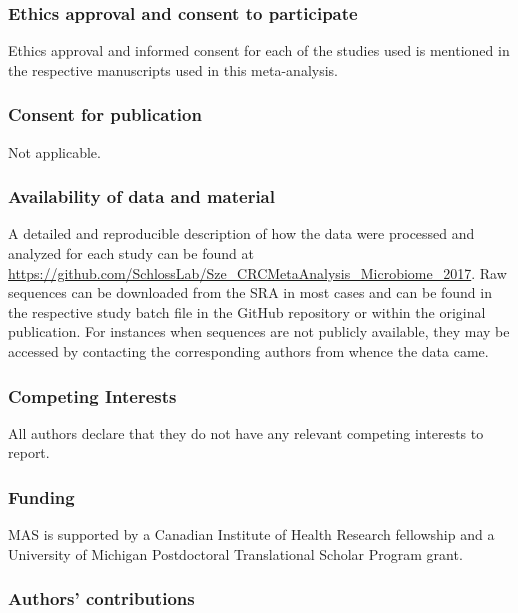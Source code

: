 \documentclass[12pt,]{article}
\begin{document}
\subsubsection{Ethics approval and consent to
participate}\label{ethics-approval-and-consent-to-participate}

Ethics approval and informed consent for each of the studies used is
mentioned in the respective manuscripts used in this meta-analysis.

\subsubsection{Consent for publication}\label{consent-for-publication}

Not applicable.

\subsubsection{Availability of data and
material}\label{availability-of-data-and-material}

A detailed and reproducible description of how the data were processed
and analyzed for each study can be found at
\url{https://github.com/SchlossLab/Sze_CRCMetaAnalysis_Microbiome_2017}.
Raw sequences can be downloaded from the SRA in most cases and can be
found in the respective study batch file in the GitHub repository or
within the original publication. For instances when sequences are not
publicly available, they may be accessed by contacting the corresponding
authors from whence the data came.

\subsubsection{Competing Interests}\label{competing-interests}

All authors declare that they do not have any relevant competing
interests to report.

\subsubsection{Funding}\label{funding}

MAS is supported by a Canadian Institute of Health Research fellowship
and a University of Michigan Postdoctoral Translational Scholar Program
grant.

\subsubsection{Authors' contributions}\label{authors-contributions}
\end{document}
